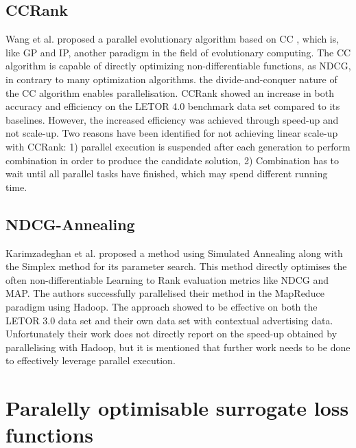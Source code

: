\subsection{CCRank}
Wang et al. \cite{Wang2011a,Wang2011b} proposed a parallel evolutionary algorithm based on \ac{CC} \cite{Potter2000}, which is, like \ac{GP} and \ac{IP}, another paradigm in the field of evolutionary computing. The \ac{CC} algorithm is capable of directly optimizing non-differentiable functions, as \ac{NDCG}, in contrary to many optimization algorithms.  the divide-and-conquer nature of the \ac{CC} algorithm enables parallelisation. CCRank showed an increase in both accuracy and efficiency on the LETOR 4.0 benchmark data set compared to its baselines. However, the increased efficiency was achieved through speed-up and not scale-up. Two reasons have been identified for not achieving linear scale-up with CCRank: 1) parallel execution is suspended after each generation to perform combination in order to produce the candidate solution, 2) Combination has to wait until all parallel tasks have finished, which may spend different running time.
\subsection{NDCG-Annealing}
Karimzadeghan et al. \cite{Karimzadehgan2011} proposed a method using Simulated Annealing along with the Simplex method for its parameter search. This method directly optimises the often non-differentiable Learning to Rank evaluation metrics like \ac{NDCG} and \ac{MAP}. The authors successfully parallelised their method in the MapReduce paradigm using Hadoop. The approach showed to be effective on both the LETOR 3.0 data set and their own data set with contextual advertising data. Unfortunately their work does not directly report on the speed-up obtained by parallelising  with Hadoop, but it is mentioned that further work needs to be done to effectively leverage parallel execution.\\

\section{Paralelly optimisable surrogate loss functions}
